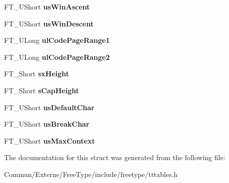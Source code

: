 \begin{DoxyCompactItemize}
\item 
F\+T\+\_\+\+U\+Short {\bfseries us\+Win\+Ascent}\hypertarget{struct_t_t___o_s2___aeb85b76e77753e4b59945550bdd098a1}{}\label{struct_t_t___o_s2___aeb85b76e77753e4b59945550bdd098a1}

\item 
F\+T\+\_\+\+U\+Short {\bfseries us\+Win\+Descent}\hypertarget{struct_t_t___o_s2___a573ace3da03efa98a716a8443e4d0084}{}\label{struct_t_t___o_s2___a573ace3da03efa98a716a8443e4d0084}

\item 
F\+T\+\_\+\+U\+Long {\bfseries ul\+Code\+Page\+Range1}\hypertarget{struct_t_t___o_s2___a0b5a2875c21d20e5a5b5f3641ddb29fc}{}\label{struct_t_t___o_s2___a0b5a2875c21d20e5a5b5f3641ddb29fc}

\item 
F\+T\+\_\+\+U\+Long {\bfseries ul\+Code\+Page\+Range2}\hypertarget{struct_t_t___o_s2___ad117c64d73d15d1304c75fb5f41f1124}{}\label{struct_t_t___o_s2___ad117c64d73d15d1304c75fb5f41f1124}

\item 
F\+T\+\_\+\+Short {\bfseries sx\+Height}\hypertarget{struct_t_t___o_s2___a2eb3bb1392461a536c393304bde72835}{}\label{struct_t_t___o_s2___a2eb3bb1392461a536c393304bde72835}

\item 
F\+T\+\_\+\+Short {\bfseries s\+Cap\+Height}\hypertarget{struct_t_t___o_s2___ac755913b648d535d1207927e4a6f1ec0}{}\label{struct_t_t___o_s2___ac755913b648d535d1207927e4a6f1ec0}

\item 
F\+T\+\_\+\+U\+Short {\bfseries us\+Default\+Char}\hypertarget{struct_t_t___o_s2___af8639fefeb705a9287df996b224462ea}{}\label{struct_t_t___o_s2___af8639fefeb705a9287df996b224462ea}

\item 
F\+T\+\_\+\+U\+Short {\bfseries us\+Break\+Char}\hypertarget{struct_t_t___o_s2___a1d47030e246d2593ec3e4cdf66b17161}{}\label{struct_t_t___o_s2___a1d47030e246d2593ec3e4cdf66b17161}

\item 
F\+T\+\_\+\+U\+Short {\bfseries us\+Max\+Context}\hypertarget{struct_t_t___o_s2___a167313e407c77db2c4ca5a987f3a1482}{}\label{struct_t_t___o_s2___a167313e407c77db2c4ca5a987f3a1482}

\end{DoxyCompactItemize}


The documentation for this struct was generated from the following file\+:\begin{DoxyCompactItemize}
\item 
Commun/\+Externe/\+Free\+Type/include/freetype/tttables.\+h\end{DoxyCompactItemize}
